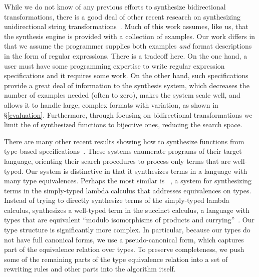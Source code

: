 \documentclass[acmsmall]{acmart}
\begin{document}
While we do not know of any previous efforts to synthesize bidirectional
transformations, there is a good deal of other recent research on
synthesizing unidirectional string
transformations~\cite{singh2012learning,le-pldi-2014,gulwani-popl-2014,perelman2014test,Singh:blinkfill}.
Much of this 
work assumes, like us, that the synthesis engine is provided with a collection of
examples.  Our work differs in that we assume the programmer supplies
both examples {\em and} format descriptions in the form of regular expressions.
There is a tradeoff here.  On the one hand, a user must have some 
programming expertise to
write regular expression specifications
and it requires some work.
On the other hand, such specifications provide a great deal of information
to the synthesis system, which decreases the number of examples needed
(often to zero), makes the system scale well, and
allows it to handle large, complex formats with variation, as shown
in \S \ref{evaluation}. 
Furthermore, through focusing on bidirectional transformations we limit the
of synthesized functions to bijective ones, reducing the search space.

There are many other recent results showing how to synthesize functions from
type-based
specifications~\cite{augustsson-2004,tds-pldi,feser-pldi-2015,scherer-icfp-2015,frankle+:popl16,armando+:pldi16}.
These systems enumerate programs of their target language, orienting their
search procedures to process only terms that are well-typed.
Our system is distinctive in that it synthesizes terms in a language with many
type equivalences. 
Perhaps the most similar is \InSynth{}~\cite{gvero-pldi-2013}, a system for
synthesizing terms in the simply-typed lambda calculus that addresses
equivalences on types.  Instead of trying to directly synthesize terms of the
simply-typed lambda calculus, \InSynth{} synthesizes a well-typed term
in the succinct calculus, a language with types
that are equivalent ``modulo isomorphisms of products and
currying''~\cite{gvero-pldi-2013}.
Our type structure is significantly more complex.  In particular, because our 
types do not have full canonical forms, we
use a pseudo-canonical form, which captures part of the equivalence
relation over types.  To preserve completeness, we push some of the remaining
parts of the type equivalence relation into a set of rewriting rules and
other parts into
the \RigidSynth{} algorithm itself.
\end{document}
